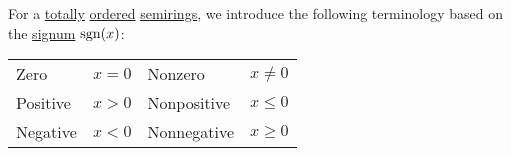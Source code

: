 \begin{definition}\label{def:ordered_semiring_positivity}\mimprovised
  For a \hyperref[def:totally_ordered_set]{totally} \hyperref[def:ordered_semiring]{ordered} \hyperref[def:semiring]{semirings}, we introduce the following terminology based on the \hyperref[def:signum]{signum} \( \operatorname{sgn}(x) \):
  \begin{center}
    \begin{tabular}{l l !{\qquad} l l}
      Zero        & \( x = 0 \) & Nonzero     & \( x \neq 0 \)  \\
      Positive    & \( x > 0 \) & Nonpositive & \( x \leq 0 \) \\
      Negative    & \( x < 0 \) & Nonnegative & \( x \geq 0 \) \\
    \end{tabular}
  \end{center}
\end{definition}

